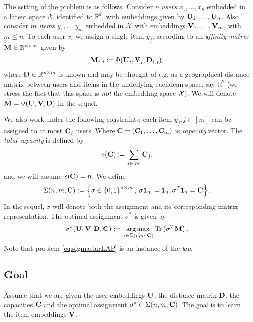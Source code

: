 The setting of the problem is as follows. Consider $n$ \emph{users} $x_1, \ldots, x_n$ embedded in a latent space $\mathcal {X}$ identified to $\mathbb{R}^d$, with embeddings given by $\mathbf{U}_1, \ldots, \mathbf{U}_n$. Also consider $m$ \emph{items} $y_1,\ldots, y_m$ embedded in $\mathcal {X}$ with embeddings $\mathbf{V}_1, \ldots, \mathbf{V}_m$, with $m \leq n$. To each user $x_i$ we assign a single item $y_j$, according to an \emph{affinity matrix} $\mathbf{M} \in \mathbb{R}^{n \times m}$ given by
\begin{equation*}\label{eq:def_M}
    \mathbf{M}_{i,j} := \Phi(\mathbf{U}_i,\mathbf{V}_j,\mathbf{D}_{i,j}),
\end{equation*} where $\mathbf{D} \in \mathbb{R}^{n \times m}$ is known and may be thought of e.g. as a geographical distance matrix between users and items in the underlying euclidean space, say $\mathbb{R}^2$ (we stress the fact that this space is \emph{not} the embedding space $\mathcal {X}$). We will denote $\mathbf{M} = \Phi(\mathbf{U},\mathbf{V},\mathbf{D})$ in the sequel.

We also work under the following constraints: each item $y_j, j \in [m]$ can be assigned to at most $\mathbf{C}_j$ users. Where $\mathbf{C}=(\mathbf{C}_1,\ldots,\mathbf{C}_m)$ is \emph{capacity} vector. The \emph{total capacity} is defined by
\begin{equation*}
    s(\mathbf{C}) := \sum_{j \in [m]} \mathbf{C}_j,
\end{equation*} and we will assume $s(\mathbf{C}) = n$.
We define
\begin{equation*}\label{eq:defSigma}
    \Sigma(n,m,\mathbf{C}) := \left\lbrace \sigma \in \left\{ 0,1\right\}^{n \times m}, \; {\sigma \mathbf{1}_m}  = { \mathbf{1}_n}, {\sigma^T \mathbf{1}_n} = \mathbf{C} \right\rbrace.
\end{equation*} In the sequel, $\sigma$ will denote both the assignment and its corresponding matrix representation. The optimal assignment $\sigma^*$ is given by
\begin{equation}\label{eq:sigmastarLAP}
    \sigma^*(\mathbf{U},\mathbf{V},\mathbf{D},\mathbf{C}) := \operatorname*{arg\,max}_{\sigma \in \Sigma(n,m,\mathbf{C})} {\rm Tr}\left( \sigma^T \mathbf{M} \right),
\end{equation}
Note that problem \eqref{eq:sigmastarLAP} is an instance of the \emph{\ac{lap}}.

\subsection*{Goal} Assume that we are given the user embeddings $\mathbf{U}$, the distance matrix $\mathbf{D}$, the capacities $\mathbf{C}$ and the optimal assignment $\sigma^* \in \Sigma(n,m,\mathbf{C})$. The goal is to learn the item embeddings $\mathbf{V}$.

